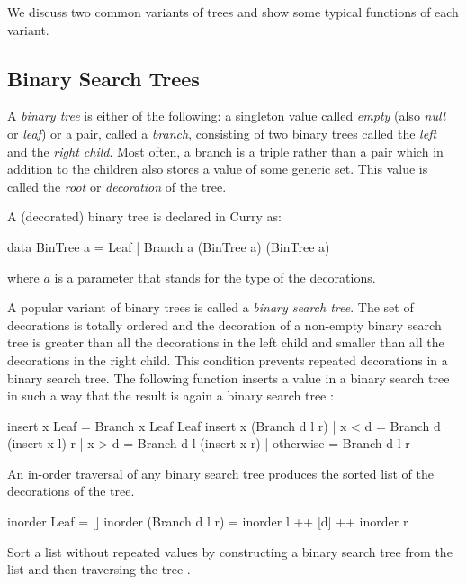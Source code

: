 We discuss two common variants of trees and show some typical functions
of each variant.

\subsection{Binary Search Trees}

A \emph{binary tree} is either of the
following: a singleton value called \emph{empty}
(also \emph{null} or \emph{leaf}) or a pair, called a
\emph{branch}, consisting of two
binary trees called the \emph{left} and the \emph{right child}.
Most often, a branch is a triple rather than a pair
which in addition to the children
also stores a value of some generic set.  This value
is called the \emph{root} or \emph{decoration}
of the tree.

\medskip\noindent
A (decorated) binary tree is declared in Curry as:
%
\begin{prog}
data BinTree a = Leaf | Branch a (BinTree a) (BinTree a)
\end{prog}
%
where $a$ is a parameter that stands for the type of the
decorations.

A popular variant of binary trees is called a
\emph{binary search tree}.
The set of decorations is totally ordered and the decoration
of a non-empty binary search tree is greater than all the decorations
in the left child and smaller than all the decorations
in the right child.
This condition prevents repeated decorations in a binary search tree.
The following function inserts a value in a binary search tree
in such a way that the result is again a binary search tree
:
%
\begin{prog}
insert x Leaf = Branch x Leaf Leaf
insert x (Branch d l r)
  | x < d = Branch d (insert x l) r
  | x > d = Branch d l (insert x  r)
  | otherwise = Branch d l r
\end{prog}
%
An in-order traversal of any binary search tree
produces the sorted list of the decorations of the tree.
%
\begin{prog}
inorder Leaf = []
inorder (Branch d l r) = inorder l ++ [d] ++ inorder r
\end{prog}
%
\begin{exercise}
Sort a list without repeated values by constructing
a binary search tree from the list and then traversing the
tree
.
\end{exercise}

